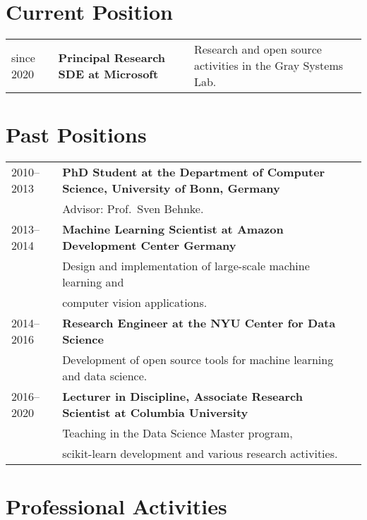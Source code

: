 \documentclass[a4paper,9pt]{article}
\begin{document}
\maketitle

\section{Current Position}
\begin{tabular}{lll}
    since 2020 & \textbf{Principal Research SDE at Microsoft}
               & Research and open source activities in the Gray Systems Lab.
\end{tabular}

\section{Past Positions}
\begin{tabular}{lll}
    2010--2013 & \textbf{PhD Student at the Department of Computer Science, University of Bonn, Germany}\\
         & Advisor: Prof.\ Sven Behnke. \\
    2013--2014 & \textbf{Machine Learning Scientist at Amazon Development Center Germany}\\
              & Design and implementation of large-scale machine learning and\\
              & computer vision applications.\\
    2014--2016 & \textbf{Research Engineer at the NYU Center for Data Science}\\
               & Development of open source tools for machine learning and data science.\\
    2016--2020 & \textbf{Lecturer in Discipline, Associate Research Scientist at Columbia University}\\
               & Teaching in the Data Science Master program, \\
               & scikit-learn development and various research activities.
\end{tabular}

\section{Professional Activities}
\end{document}
